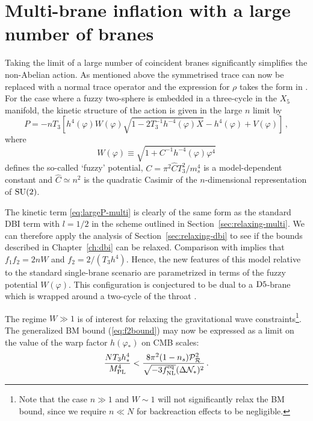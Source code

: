 \section{Multi-brane inflation with a large number of branes}
\label{sec:twlargen-multi}
Taking the limit of a large number of coincident branes significantly
simplifies the non-Abelian action. As mentioned above the symmetrised trace can
now be replaced with a normal trace operator and the expression for $\rho$
takes the form in . 
% 
 For the case where a fuzzy two-sphere is 
embedded in a three-cycle in the $X_5$ manifold, 
the kinetic structure of the action is given in the large $n$ limit by 
\cite{thomasward}
% 
\begin{equation}
\label{eq:largeP-multi}
P=-nT_3 \left[ h^4(\varphi ) W(\varphi ) 
\sqrt{1-2 T_3^{-1} h^{-4}(\varphi) X}
-h^4(\varphi ) + V (\varphi ) \right] \,,
\end{equation}
% 
where
%    
\begin{equation} 
\label{eq:defW}
W (\varphi ) \equiv \sqrt{1+ C^{-1}h^{-4}(\varphi ) \varphi^4}
\end{equation}
% 
defines the so-called `fuzzy' potential, 
$C = \pi^2 \hat{C}T_3^2/m_s^4$ is a model-dependent constant and 
$\hat{C} \simeq n^2$ 
is the quadratic Casimir of the $n$-dimensional representation of 
${\rm SU}(2)$. 

The kinetic term \eqref{eq:largeP-multi} is clearly of the same form as the
standard DBI term with $l=1/2$ in the scheme outlined in
Section~\ref{sec:relaxing-multi}. We can therefore apply the analysis of
Section~\ref{sec:relaxing-dbi} to see if the bounds described in
Chapter~\ref{ch:dbi} can be relaxed.
Comparison with  
implies that $f_1f_2 =2nW$ and $f_2=2/(T_3h^4)$. Hence, 
the new features of this model relative to the standard single-brane 
scenario are parametrized in terms of the fuzzy potential $W (\varphi )$. 
This configuration is conjectured to be dual to 
a ${\rm D5}$-brane which is wrapped around a two-cycle 
of the throat \cite{dual1,dual2,dual3}. 


The regime $W \gg 1$ is of interest for 
relaxing the gravitational wave constraints\footnote{Note that 
the case $n \gg 1$ and
$W \sim 1$ will not significantly relax the BM bound, 
since we require $n \ll N$ for backreaction effects to be negligible.}. 
The generalized BM bound (\ref{eq:f2bound}) may now be expressed as 
a limit on the value of the warp factor $h(\varphi_*)$ on CMB scales: 
% 
\begin{equation}
\label{eq:warptorelax}
\frac{NT_3h^4_*}{M_{\mathrm{PL}}^4} < 
\frac{8\pi^2 (1-n_s)\mathcal{P}_{\mathcal{R}}^2 }{\sqrt{-3f_{\mathrm{NL}}^{\mathrm{eq}}}(\Delta \mathcal{N}_*)^2} \,.
\end{equation}
% 


